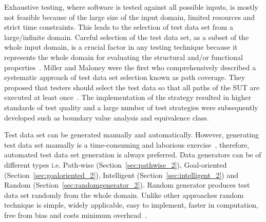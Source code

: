 Exhaustive testing, where software is tested against all possible inputs, is mostly not feasible because of the large size of the input domain, limited resources and strict time constraints. This leads to the selection of test data set from a large/infinite domain. Careful selection of the test data set, as a subset of the whole input domain, is a crucial factor in any testing technique because it represents the whole domain for evaluating the structural and/or functional properties~\cite{howden1986functional, mccabe1983structured}. Miller and Maloney were the first who comprehensively described a systematic approach of test data set selection known as path coverage. They proposed that testers should select the test data so that all paths of the SUT are executed at least once~\cite{miller1963systematic}. The implementation of the strategy resulted in higher standards of test quality and a large number of test strategies were subsequently developed such as boundary value analysis and equivalence class. 

Test data set can be generated manually and automatically. However, generating test data set manually is a time-consuming and laborious exercise~\cite{korel1990automated}, therefore, automated test data set generation is always preferred. Data generators can be of different types i.e. Path-wise (Section~\ref{sec:pathwise_2}), Goal-oriented (Section~\ref{sec:goaloriented_2}), Intelligent (Section~\ref{sec:intelligent_2}) and Random (Section~\ref{sec:randomgenerator_2}). Random generator produces test data set randomly from the whole domain. Unlike other approaches random technique is simple, widely applicable, easy to implement, faster in computation, free from bias and costs minimum overhead~\cite{ciupa2007experimental}. 

